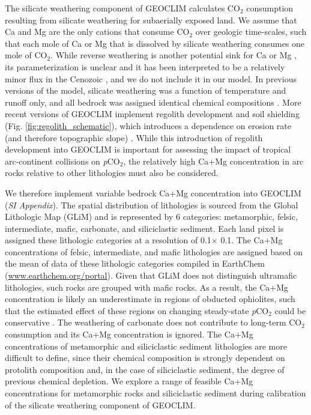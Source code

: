 \documentclass[9pt,twocolumn,twoside,lineno]{pnas-new}
\newcommand{\degrees}{\textdegree\xspace}
\newcommand{\pCOtwo}{\textit{p}CO$_{2}$\xspace}
\newcommand{\COtwo}{CO$_{2}$\xspace}
\newcommand{\SI}{\textit{SI Appendix}\xspace}
\begin{document}
The silicate weathering component of GEOCLIM calculates \COtwo consumption resulting from silicate weathering for subaerially exposed land. We assume that Ca and Mg are the only cations that consume \COtwo over geologic time-scales, such that each mole of Ca or Mg that is dissolved by silicate weathering consumes one mole of \COtwo. While reverse weathering is another potential sink for Ca or Mg \citep{Michalopoulos1995a}, its parameterization is unclear and it has been interpreted to be a relatively minor flux in the Cenozoic \citep{Isson2018a}, and we do not include it in our model. In previous versions of the model, silicate weathering was a function of temperature and runoff only, and all bedrock was assigned identical chemical compositions \cite{Godderis2017c}. More recent versions of GEOCLIM implement regolith development and soil shielding (Fig. \ref{fig:regolith_schematic}), which introduces a dependence on erosion rate (and therefore topographic slope) \cite{Maffre2018a}. While this introduction of regolith development into GEOCLIM is important for assessing the impact of tropical arc-continent collisions on \pCOtwo, the relatively high Ca+Mg concentration in arc rocks relative to other lithologies must also be considered.

We therefore implement variable bedrock Ca+Mg concentration into GEOCLIM (\SI). The spatial distribution of lithologies is sourced from the Global Lithologic Map (GLiM) \cite{Hartmann2012a} and is represented by 6 categories: metamorphic, felsic, intermediate, mafic, carbonate, and siliciclastic sediment. Each land pixel is assigned these lithologic categories at a resolution of 0.1\degrees $\times$ 0.1\degrees. The Ca+Mg concentrations of felsic, intermediate, and mafic lithologies are assigned based on the mean of data of these lithologic categories compiled in EarthChem (\url{www.earthchem.org/portal}). Given that GLiM does not distinguish ultramafic lithologies, such rocks are grouped with mafic rocks. As a result, the Ca+Mg concentration is likely an underestimate in regions of obducted ophiolites, such that the estimated effect of these regions on changing steady-state \pCOtwo could be conservative \cite{Schopka2011a}. The weathering of carbonate does not contribute to long-term \COtwo consumption and its Ca+Mg concentration is ignored. The Ca+Mg concentrations of metamorphic and siliciclastic sediment lithologies are more difficult to define, since their chemical composition is strongly dependent on protolith composition and, in the case of siliciclastic sediment, the degree of previous chemical depletion. We explore a range of feasible Ca+Mg concentrations for metamorphic rocks and siliciclastic sediment during calibration of the silicate weathering component of GEOCLIM.
\end{document}
